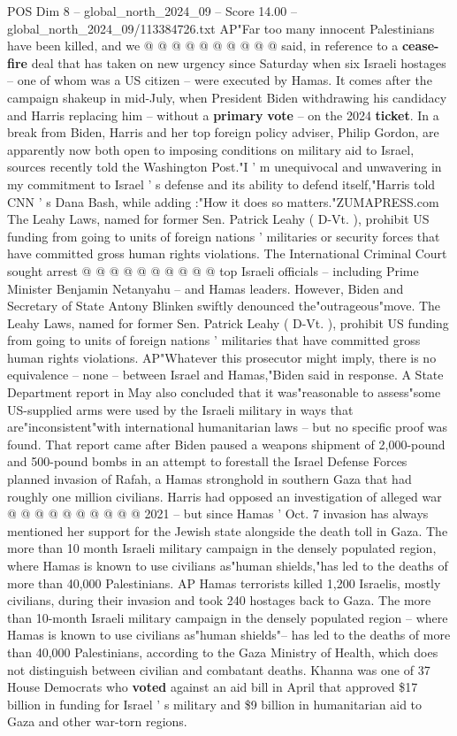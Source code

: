 \begin{textsample}{POS Dim 8 – global\_north\_2024\_09 – Score 14.00 – global\_north\_2024\_09/113384726.txt}
AP"Far too many innocent Palestinians have been killed, and we @ @ @ @ @ @ @ @ @ @ said, in reference to a \textbf{cease-fire} deal that has taken on new urgency since Saturday when six Israeli hostages -- one of whom was a US citizen -- were executed by Hamas.
It comes after the campaign shakeup in mid-July, when President Biden withdrawing his candidacy and Harris replacing him -- without a \textbf{primary} \textbf{vote} -- on the 2024 \textbf{ticket}.
In a break from Biden, Harris and her top foreign policy adviser, Philip Gordon, are apparently now both open to imposing conditions on military aid to Israel, sources recently told the Washington Post."I ' m unequivocal and unwavering in my commitment to Israel ' s defense and its ability to defend itself,"Harris told CNN ' s Dana Bash, while adding :"How it does so matters."ZUMAPRESS.com The Leahy Laws, named for former Sen.
Patrick Leahy ( D-Vt. ), prohibit US funding from going to units of foreign nations ' militaries or security forces that have committed gross human rights violations.
The International Criminal Court sought arrest @ @ @ @ @ @ @ @ @ @ top Israeli officials -- including Prime Minister Benjamin Netanyahu -- and Hamas leaders.
However, Biden and Secretary of State Antony Blinken swiftly denounced the"outrageous"move.
The Leahy Laws, named for former Sen.
Patrick Leahy ( D-Vt. ), prohibit US funding from going to units of foreign nations ' militaries that have committed gross human rights violations.
AP"Whatever this prosecutor might imply, there is no equivalence -- none -- between Israel and Hamas,"Biden said in response.
A State Department report in May also concluded that it was"reasonable to assess"some US-supplied arms were used by the Israeli military in ways that are"inconsistent"with international humanitarian laws -- but no specific proof was found.
That report came after Biden paused a weapons shipment of 2,000-pound and 500-pound bombs in an attempt to forestall the Israel Defense Forces planned invasion of Rafah, a Hamas stronghold in southern Gaza that had roughly one million civilians.
Harris had opposed an investigation of alleged war @ @ @ @ @ @ @ @ @ @ 2021 -- but since Hamas ' Oct. 7 invasion has always mentioned her support for the Jewish state alongside the death toll in Gaza.
The more than 10 month Israeli military campaign in the densely populated region, where Hamas is known to use civilians as"human shields,"has led to the deaths of more than 40,000 Palestinians.
AP Hamas terrorists killed 1,200 Israelis, mostly civilians, during their invasion and took 240 hostages back to Gaza.
The more than 10-month Israeli military campaign in the densely populated region -- where Hamas is known to use civilians as"human shields"-- has led to the deaths of more than 40,000 Palestinians, according to the Gaza Ministry of Health, which does not distinguish between civilian and combatant deaths.
Khanna was one of 37 House Democrats who \textbf{voted} against an aid bill in April that approved \$17 billion in funding for Israel ' s military and \$9 billion in humanitarian aid to Gaza and other war-torn regions.


\end{textsample}
